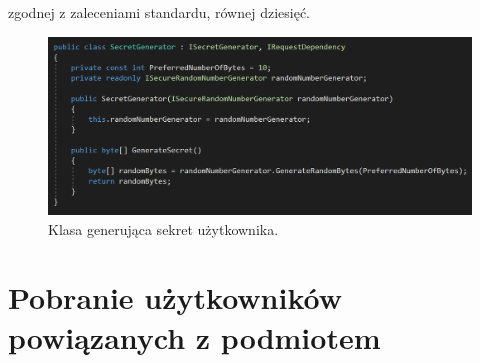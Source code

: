 zgodnej z zaleceniami standardu, równej dziesięć.
\begin{figure}[t]
    \centering
	\includegraphics[width=\textwidth]{content/images/code-secretgenerator}
    \caption{Klasa generująca sekret użytkownika.}
    \label{code-secretgenerator}
\end{figure}

\section{Pobranie użytkowników powiązanych z podmiotem}

